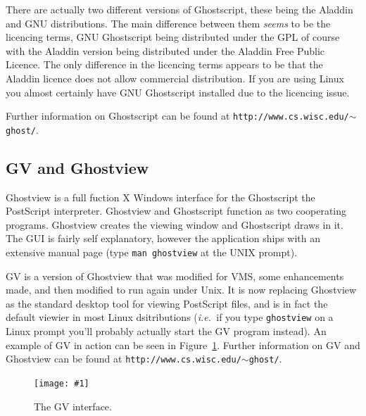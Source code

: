 \documentclass[twoside,11pt]{article}
\newcommand{\htmladdnormallink}[2]{#1}
\newcommand{\htmladdimg}[1]{}
\newcommand{\htmlref}[2]{#1}
\newcommand{\xlabel}[1]{}
\newcommand{\myfig} [5] {
  \begin{figure}
    \centering\texttt{[image: \#1]}
    \typeout{#1 inserted on page \arabic{page}}
    \caption{\label{#4}#5}
  \end{figure}
  }
\newcommand{\myfig}[5]{
    \label{#4} \htmladdimg{#3}\\
    Figure: #5\\
    }
\begin{document}
There are actually two different versions of \htmladdnormallink{Ghostscript}{http://www.cs.wisc.edu/~ghost/aladdin/index.html}, these being the \htmladdnormallink{Aladdin}{http://www.cs.wisc.edu/~ghost/aladdin/index.html} and \htmladdnormallink{GNU}{http://www.cs.wisc.edu/~ghost/gnu/index.html} distributions. The main difference between them {\em seems} to be the licencing terms, GNU Ghostscript being distributed under the \htmladdnormallink{GPL}{http://www.gnu.org/copyleft/gpl.html} of course with the Aladdin version being distributed under the \htmladdnormallink{Aladdin Free Public Licence}{http://www.cs.wisc.edu/~ghost/aladdin/doc/Public.htm}. The only difference in the licencing terms appears to be that the Aladdin licence does not allow commercial distribution. If you are using Linux you almost certainly have GNU Ghostscript installed due to the licencing issue.

Further information on Ghostscript can be found at \htmladdnormallink{{\tt http://www.cs.wisc.edu/$\sim$ghost/}}{http://www.cs.wisc.edu/~ghost/}.

\subsection{\xlabel{sc15_gv}GV and Ghostview\label{sc15_gv}}

\htmladdnormallink{Ghostview}{http://www.cs.wisc.edu/~ghost/ghostview/index.html} is a full fuction X Windows interface for the \htmlref{Ghostscript}{sc15_gs} the PostScript interpreter. Ghostview and Ghostscript function as two cooperating programs. Ghostview creates the viewing window and Ghostscript draws in it. The GUI is fairly self explanatory, however the application ships with an extensive manual page (type {\tt man ghostview} at the UNIX prompt). 

\htmladdnormallink{GV}{http://www.cs.wisc.edu/~ghost/gv/index.html} is a version of Ghostview that was modified for VMS, some enhancements made, and then modified to run again under Unix. It is now replacing Ghostview as the standard desktop tool for viewing PostScript files, and is in fact the default viewier in most Linux dsitributions ({\em i.e.\ }if you type {\tt ghostview} on a Linux prompt you'll probably actually start the GV program instead). An example of GV in action can be seen in Figure~\ref{sc15_gv_interface}. Further information on GV and Ghostview can be found at \htmladdnormallink{{\tt http://www.cs.wisc.edu/$\sim$ghost/}}{http://www.cs.wisc.edu/~ghost/}.

\myfig{sc15_gv.eps}{height=0.6\textheight}{sc15_gv.gif}{sc15_gv_interface}{The GV interface.} 
\end{document}

